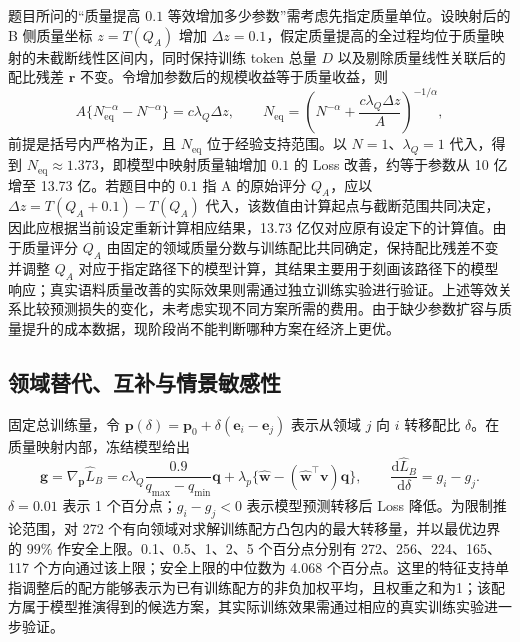 题目所问的“质量提高 $0.1$ 等效增加多少参数”需考虑先指定质量单位。设映射后的 B 侧质量坐标 $z=T(Q_A)$ 增加 $\Delta z=0.1$，假定质量提高的全过程均位于质量映射的未截断线性区间内，同时保持训练 token 总量 \(D\) 以及剔除质量线性关联后的配比残差 \(\boldsymbol r\) 不变。令增加参数后的规模收益等于质量收益，则
\begin{equation}
A\{N_{\mathrm{eq}}^{-\alpha}-N^{-\alpha}\}=c\lambda_Q\Delta z,
\qquad
N_{\mathrm{eq}}=\left(N^{-\alpha}+\frac{c\lambda_Q\Delta z}{A}\right)^{-1/\alpha},
\label{eq:q2-equivalent}
\end{equation}
前提是括号内严格为正，且 $N_{\mathrm{eq}}$ 位于经验支持范围。以 $N=1$、$\lambda_Q=1$ 代入，得到 $N_{\mathrm{eq}}\approx1.373$，即模型中映射质量轴增加 $0.1$ 的 Loss 改善，约等于参数从 10 亿增至 13.73 亿。若题目中的 $0.1$ 指 A 的原始评分 $Q_A$，应以 $\Delta z=T(Q_A+0.1)-T(Q_A)$ 代入，该数值由计算起点与截断范围共同决定，因此应根据当前设定重新计算相应结果，13.73 亿仅对应原有设定下的计算值。由于质量评分 \(Q_A\) 由固定的领域质量分数与训练配比共同确定，保持配比残差不变并调整 \(Q_A\) 对应于指定路径下的模型计算，其结果主要用于刻画该路径下的模型响应；真实语料质量改善的实际效果则需通过独立训练实验进行验证。上述等效关系比较预测损失的变化，未考虑实现不同方案所需的费用。由于缺少参数扩容与质量提升的成本数据，现阶段尚不能判断哪种方案在经济上更优。

\subsection{领域替代、互补与情景敏感性}

固定总训练量，令 $\boldsymbol p(\delta)=\boldsymbol p_0+\delta(\boldsymbol e_i-\boldsymbol e_j)$ 表示从领域 $j$ 向 $i$ 转移配比 $\delta$。在质量映射内部，冻结模型给出
\begin{equation}
\boldsymbol g=\nabla_{\boldsymbol p}\widehat L_B
=c\lambda_Q\frac{0.9}{q_{\max}-q_{\min}}\boldsymbol q
+\lambda_p\{\widehat{\boldsymbol w}-(\widehat{\boldsymbol w}^{\top}\boldsymbol v)\boldsymbol q\},
\qquad \frac{\mathrm d\widehat L_B}{\mathrm d\delta}=g_i-g_j.
\label{eq:q2-substitution}
\end{equation}
$\delta=0.01$ 表示 1 个百分点；$g_i-g_j<0$ 表示模型预测转移后 Loss 降低。为限制推论范围，对 272 个有向领域对求解训练配方凸包内的最大转移量，并以最优边界的 $99\%$ 作安全上限。0.1、0.5、1、2、5 个百分点分别有 272、256、224、165、117 个方向通过该上限；安全上限的中位数为 4.068 个百分点。这里的特征支持单指调整后的配方能够表示为已有训练配方的非负加权平均，且权重之和为1；该配方属于模型推演得到的候选方案，其实际训练效果需通过相应的真实训练实验进一步验证。

